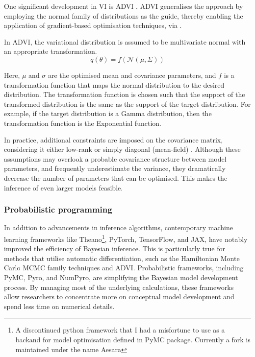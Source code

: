 One significant development in \ac{VI} is \ac{ADVI} \parencite{Kucukelbir2016-gn}. \ac{ADVI} generalises the approach by employing the normal family of distributions as the guide, thereby enabling the application of gradient-based optimisation techniques, via .

In \ac{ADVI}, the variational distribution is assumed to be multivariate normal with an appropriate transformation.
\begin{equation}
q(\theta) = f(\mathcal{N}(\mu, \Sigma))
\end{equation}

Here, $\mu$ and $\sigma$ are the optimised mean and covariance parameters, and $f$ is a transformation function that maps the normal distribution to the desired distribution. The transformation function is chosen such that the support of the transformed distribution is the same as the support of the target distribution. For example, if the target distribution is a Gamma distribution, then the transformation function is the Exponential function. 

In practice, additional constraints are imposed on the covariance matrix, considering it either low-rank or simply diagonal (mean-field) \parencite{Blei2017-dm}. Although these assumptions may overlook a probable covariance structure between model parameters, and frequently underestimate the variance, they dramatically decrease the number of parameters that can be optimised. This makes the inference of even larger models feasible.

\subsubsection*{Probabilistic programming}
In addition to advancements in inference algorithms, contemporary machine learning frameworks like \ac{Theano}\footnote{A discontinued python framework that I had a misfortune to use as a backand for model optimisation defined in PyMC package. Currently a fork is maintained under the name Aesara}, \ac{PyTorch}, \ac{TensorFlow}, and \ac{JAX}, have notably improved the efficiency of Bayesian inference. This is particularly true for methods that utilise automatic differentiation, such as the Hamiltonian Monte Carlo \ac{MCMC} family techniques and \ac{ADVI}. Probabilistic frameworks, including \ac{PyMC}, \ac{Pyro}, and \ac{NumPyro}, are simplifying the Bayesian model development process. By managing most of the underlying calculations, these frameworks allow researchers to concentrate more on conceptual model development and spend less time on numerical details.

